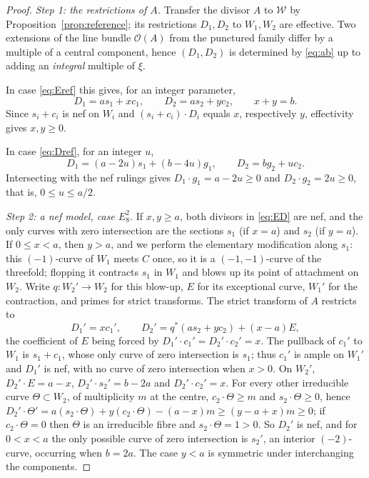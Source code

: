 \documentclass[12pt]{article}
\newcommand{\calW}{\mathcal W}
\theoremstyle{definition}
\theoremstyle{remark}
\begin{document}
\begin{proof}
\emph{Step 1: the restrictions of \(A\).}
Transfer the divisor \(A\) to \(\calW\) by
Proposition~\ref{prop:reference}; its restrictions \(D_1,D_2\) to
\(W_1,W_2\) are effective. Two extensions of the line bundle
\(\mathcal O(A)\) from the punctured family differ by a multiple of a
central component, hence \((D_1,D_2)\) is determined by \eqref{eq:ab} up to
adding an \emph{integral} multiple of \(\xi\).

In case \eqref{eq:Eref} this gives, for an integer parameter,
\begin{equation}\label{eq:ED}
 D_1=as_1+xc_1,\qquad D_2=as_2+yc_2,\qquad x+y=b .
\end{equation}
Since \(s_i+c_i\) is nef on \(W_i\) and \((s_i+c_i)\cdot D_i\) equals
\(x\), respectively \(y\), effectivity gives \(x,y\geq0\).

In case \eqref{eq:Dref}, for an integer \(u\),
\begin{equation}\label{eq:DD}
 D_1=(a-2u)s_1+(b-4u)g_1,\qquad D_2=bg_2+uc_2 .
\end{equation}
Intersecting with the nef rulings gives \(D_1\cdot g_1=a-2u\geq0\) and
\(D_2\cdot g_2=2u\geq0\), that is, \(0\leq u\leq a/2\).

\emph{Step 2: a nef model, case \(E_8^2\).}
If \(x,y\geq a\), both divisors in \eqref{eq:ED} are nef, and the
only curves with zero intersection are the sections \(s_1\) (if
\(x=a\)) and \(s_2\) (if \(y=a\)). If \(0\leq x<a\), then \(y>a\), and
we perform the elementary modification along \(s_1\): this
\((-1)\)-curve of \(W_1\) meets \(C\) once, so it is a
\((-1,-1)\)-curve of the threefold; flopping it contracts \(s_1\) in
\(W_1\) and blows up its point of attachment on \(W_2\). Write
\(q\colon W_2'\to W_2\) for this blow-up, \(E\) for its exceptional
curve, \(W_1'\) for the contraction, and primes for strict transforms.
The strict transform of \(A\) restricts to
\begin{equation}\label{eq:flop}
 D_1'=xc_1',\qquad D_2'=q^*(as_2+yc_2)+(x-a)E ,
\end{equation}
the coefficient of \(E\) being forced by
\(D_1'\cdot c_1'=D_2'\cdot c_2'=x\). The pullback of \(c_1'\) to \(W_1\) is \(s_1+c_1\), whose only curve
of zero intersection is \(s_1\); thus \(c_1'\) is ample on \(W_1'\)
and \(D_1'\) is nef, with no curve of zero intersection when \(x>0\).
On \(W_2'\), \(D_2'\cdot E=a-x\), \(D_2'\cdot s_2'=b-2a\) and
\(D_2'\cdot c_2'=x\). For every other irreducible curve \(\Theta\subset W_2\), of
multiplicity \(m\) at the centre, \(c_2\cdot\Theta\geq m\) and
\(s_2\cdot\Theta\geq0\), hence
\(D_2'\cdot\Theta'=a(s_2\cdot\Theta)+y(c_2\cdot\Theta)-(a-x)m\geq
(y-a+x)m\geq0\); if \(c_2\cdot\Theta=0\) then \(\Theta\) is an
irreducible fibre and \(s_2\cdot\Theta=1>0\). So \(D_2'\) is nef, and
for \(0<x<a\) the only possible curve of zero intersection is
\(s_2'\), an interior \((-2)\)-curve, occurring when \(b=2a\). The case
\(y<a\) is symmetric under interchanging the components.


\end{proof}
\end{document}
